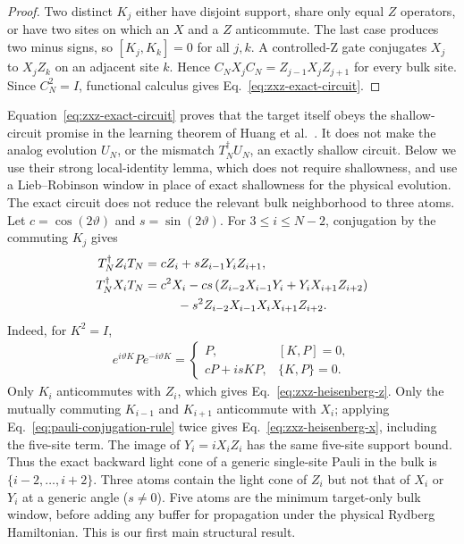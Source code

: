 \begin{proof}
Two distinct $K_j$ either have disjoint support, share only equal $Z$
operators, or have two sites on which an $X$ and a $Z$ anticommute.  The last
case produces two minus signs, so $[K_j,K_k]=0$ for all $j,k$.  A controlled-Z
gate conjugates $X_j$ to $X_jZ_k$ on an adjacent site $k$.  Hence
$C_NX_jC_N=Z_{j-1}X_jZ_{j+1}$ for every bulk site.  Since $C_N^2=I$,
functional calculus gives Eq.~\eqref{eq:zxz-exact-circuit}.
\end{proof}

Equation~\eqref{eq:zxz-exact-circuit} proves that the target itself obeys the
shallow-circuit promise in the learning theorem of Huang et
al.~\cite{huang_2024_learning}.  It does not make the analog evolution $U_N$,
or the mismatch $T_N^\dagger U_N$, an exactly shallow circuit.  Below we use
their strong local-identity lemma, which does not require shallowness, and use
a Lieb--Robinson window in place of exact shallowness for the physical
evolution.  The exact circuit does not reduce the relevant bulk neighborhood
to three atoms.  Let $c=\cos(2\vartheta)$ and
$s=\sin(2\vartheta)$.  For $3\leq i\leq N-2$, conjugation by the commuting
$K_j$ gives
\begin{align}
T_N^\dagger Z_iT_N
={}&cZ_i+sZ_{i-1}Y_iZ_{i+1},
\label{eq:zxz-heisenberg-z}\\
T_N^\dagger X_iT_N
={}&c^2X_i-cs\left(
Z_{i-2}X_{i-1}Y_i+Y_iX_{i+1}Z_{i+2}\right)\nonumber\\
&\hspace{1.3em}-s^2Z_{i-2}X_{i-1}X_iX_{i+1}Z_{i+2}.
\label{eq:zxz-heisenberg-x}
\end{align}
Indeed, for $K^2=I$,
\begin{align}
e^{i\vartheta K}Pe^{-i\vartheta K}
=
\begin{cases}
P,&[K,P]=0,\\
cP+isKP,&\{K,P\}=0.
\end{cases}
\label{eq:pauli-conjugation-rule}
\end{align}
Only $K_i$ anticommutes with $Z_i$, which gives
Eq.~\eqref{eq:zxz-heisenberg-z}.  Only the mutually commuting
$K_{i-1}$ and $K_{i+1}$ anticommute with $X_i$; applying
Eq.~\eqref{eq:pauli-conjugation-rule} twice gives
Eq.~\eqref{eq:zxz-heisenberg-x}, including the five-site term.
The image of $Y_i=iX_iZ_i$ has the same five-site support bound.  Thus the
exact backward light cone of a generic single-site Pauli in the bulk is
$\{i-2,\ldots,i+2\}$.  Three atoms contain the light cone of $Z_i$ but not
that of $X_i$ or $Y_i$ at a generic angle ($s\neq0$).  Five atoms are the
minimum target-only bulk window, before adding any buffer for propagation
under the physical Rydberg Hamiltonian.  This is our first main structural
result.


